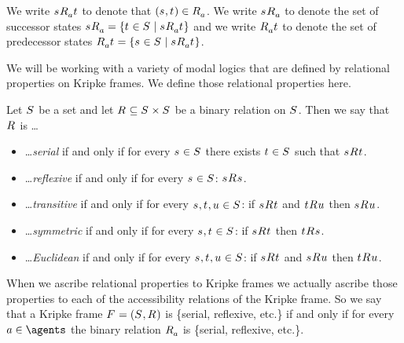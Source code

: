 We write $\kStateS \kAccessibilityA \kStateT$ to denote that $(\kStateS, \kStateT) \in \kAccessibilityA$.
We write $\kSuccessorsA{\kStateS}$ to denote the set of successor states $\kSuccessorsA{\kStateS} = \{\kStateT \in \kStates \mid \kStateS \kAccessibilityA \kStateT\}$ and
we write $\kPredecessorsA{\kStateT}$ to denote the set of predecessor states $\kPredecessorsA{\kStateT} = \{\kStateS \in \kStates \mid \kStateS \kAccessibilityA \kStateT\}$.

We will be working with a variety of modal logics that are defined by relational properties on Kripke frames.
We define those relational properties here.

\begin{definition}
Let $\kStates$ be a set and let $\kAccessibilityRel \subseteq \kStates \times \kStates$ be a binary relation on $\kStates$. 
Then we say that $\kAccessibilityRel$ is \ldots
\begin{itemize}
    \item \ldots {\em serial} if and only if for every $\kStateS \in \kStates$ there exists $\kStateT \in \kStates$ such that $\kStateS \kAccessibility{} \kStateT$.
    \item \ldots {\em reflexive} if and only if for every $\kStateS \in \kStates$: $\kStateS \kAccessibility{} \kStateS$.
    \item \ldots {\em transitive} if and only if for every $\kStateS, \kStateT, \kStateU \in \kStates$: if $\kStateS \kAccessibility{} \kStateT$ and $\kStateT \kAccessibility{} \kStateU$ then $\kStateS \kAccessibility{} \kStateU$.
    \item \ldots {\em symmetric} if and only if for every $\kStateS, \kStateT \in \kStates$: if $\kStateS \kAccessibility{} \kStateT$ then $\kStateT \kAccessibility{} \kStateS$.
    \item \ldots {\em Euclidean} if and only if for every $\kStateS, \kStateT, \kStateU \in \kStates$: if $\kStateS \kAccessibility{} \kStateT$ and $\kStateS \kAccessibility{} \kStateU$ then $\kStateT \kAccessibility{} \kStateU$.
\end{itemize}
\end{definition}

When we ascribe relational properties to Kripke frames we actually ascribe those properties to each of the accessibility relations of the Kripke frame.
So we say that a Kripke frame $\kFrameAndTuple$ is \{serial, reflexive, etc.\} if and only if for every $\agentA \in \agents$ the binary relation $\kAccessibilityA$ is \{serial, reflexive, etc.\}.

